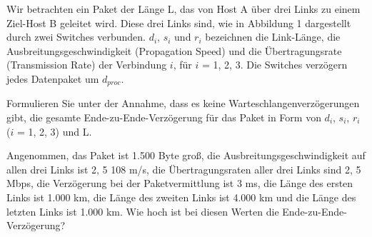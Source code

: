 \Aufgabenstellung%
Wir betrachten ein Paket der Länge L, das von Host A über drei Links zu einem Ziel-Host
B geleitet wird. Diese drei Links sind, wie in Abbildung 1 dargestellt durch zwei Switches
verbunden. $d_i$, $s_i$ und $r_i$ bezeichnen die Link-Länge, die Ausbreitungsgeschwindigkeit
(Propagation Speed) und die Übertragungsrate (Transmission Rate) der Verbindung $i$,
für $i$ = 1, 2, 3. Die Switches verzögern jedes Datenpaket um $d_{proc}$.


\Teilaufgabe%
Formulieren Sie unter der Annahme, dass es keine Warteschlangenverzögerungen
gibt, die gesamte Ende-zu-Ende-Verzögerung für das Paket in Form von $d_i$, $s_i$, $r_i$
($i$ = 1, 2, 3) und L.


\Teilaufgabe%
Angenommen, das Paket ist 1.500 Byte groß, die Ausbreitungsgeschwindigkeit auf
allen drei Links ist 2, 5 108 m/s, die Übertragungsraten aller drei Links sind 2, 5
Mbps, die Verzögerung bei der Paketvermittlung ist 3 ms, die Länge des ersten
Links ist 1.000 km, die Länge des zweiten Links ist 4.000 km und die Länge des
letzten Links ist 1.000 km. Wie hoch ist bei diesen Werten die Ende-zu-Ende-
Verzögerung?






